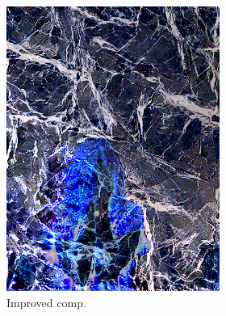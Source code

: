 \begin{figure}[]
\begin{subfigure}{\textwidth}
        \begin{subfigure}{0.24\textwidth}
            \centering
            \includegraphics[width=\textwidth]{images/04-experiment02/human/marble/improved_im.jpg}
            \caption*{Improved comp.}
        \end{subfigure}
        \hfill
        \begin{subfigure}{0.24\textwidth}
            \centering

\end{subfigure}
\end{subfigure}
\end{figure}

